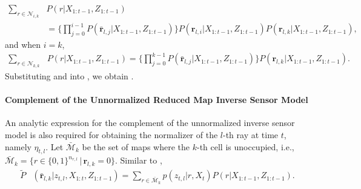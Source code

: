 \begin{align}
\sum_{r\in\mathcal{N}_{i,k}}  &P(r|X_{1:t-1},Z_{1:t-1}) 
\nonumber\\&= \bigg\{\prod_{j=0}^{i-1}P(\bar{\mathbf{r}}_{l,j}|X_{1:t-1},Z_{1:t-1})\bigg\}
P({\mathbf{r}}_{l,i}|X_{1:t-1},Z_{1:t-1})P({\mathbf{r}}_{l,k}|X_{1:t-1},Z_{1:t-1}),\label{eqn:PNik}
\end{align}
and when $i=k$, 
\begin{align}
\sum_{r\in\mathcal{N}_{k,k}} & P(r|X_{1:t-1},Z_{1:t-1})= \bigg\{\prod_{j=0}^{k-1}P(\bar{\mathbf{r}}_{l,j}|X_{1:t-1},Z_{1:t-1})\bigg\}P({\mathbf{r}}_{l,k}|X_{1:t-1},Z_{1:t-1}).\label{eqn:PNkk}
\end{align}
Substituting  and  into , we obtain .



\paragraph{Complement of the Unnormalized Reduced Map Inverse Sensor Model}
An analytic expression for the complement of the unnormalized inverse sensor model is also required  for obtaining the normalizer of the $l$-th ray at time $t$, namely $\eta_{t,l}$. Let $\bar{\mathcal{M}}_k$ be the set of maps where the $k$-th cell is unoccupied, i.e., $\bar{\mathcal{M}}_k = \{ r\in\{0,1\}^{n_{r,l}}\,|\, \mathbf{r}_{l,k}=0\}$. Similar to ,
\begin{align}
\tilde P&(\bar{\mathbf{r}}_{l,k}|z_{t,l},X_{1:t},Z_{1:t-1})= \sum_{r\in\bar{\mathcal{M}}_{k}} p(z_{t,l}|r,X_t) P(r|X_{1:t-1},Z_{1:t-1}).\label{eqn:tildePbarlk}
\end{align}

